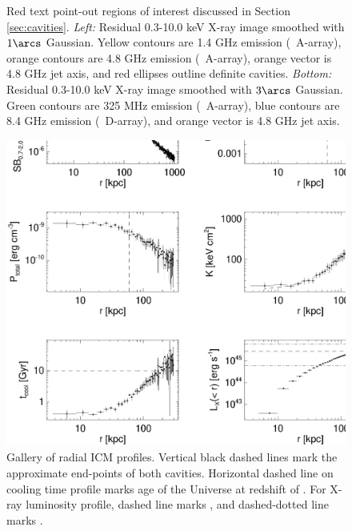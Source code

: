 \begin{figure}
\begin{center}
\begin{minipage}{0.495\linewidth}
    \end{minipage}
    \caption{Red text point-out regions of interest discussed in
      Section \ref{sec:cavities}. {\it{Left:}} Residual 0.3-10.0 keV
      X-ray image smoothed with $1\arcs$ Gaussian. Yellow contours are
      1.4 GHz emission (\vla\ A-array), orange contours are 4.8 GHz
      emission (\vla\ A-array), orange vector is 4.8 GHz jet axis, and
      red ellipses outline definite cavities. {\it{Bottom:}} Residual
      0.3-10.0 keV X-ray image smoothed with $3\arcs$ Gaussian. Green
      contours are 325 MHz emission (\vla\ A-array), blue contours are
      8.4 GHz emission (\vla\ D-array), and orange vector is 4.8 GHz
      jet axis.}
    \label{fig:subxray}
  \end{center}
\end{figure}

\begin{figure}
  \begin{center}
    \begin{minipage}{\linewidth}
      \includegraphics*[width=\textwidth]{r797_nhfro.eps}
      \caption{Gallery of radial ICM profiles. Vertical black dashed
        lines mark the approximate end-points of both
        cavities. Horizontal dashed line on cooling time profile marks
        age of the Universe at redshift of \rbs. For X-ray luminosity
        profile, dashed line marks \lcool, and dashed-dotted line
        marks \pcav.}
      \label{fig:gallery}
    \end{minipage}
  \end{center}
\end{figure}

